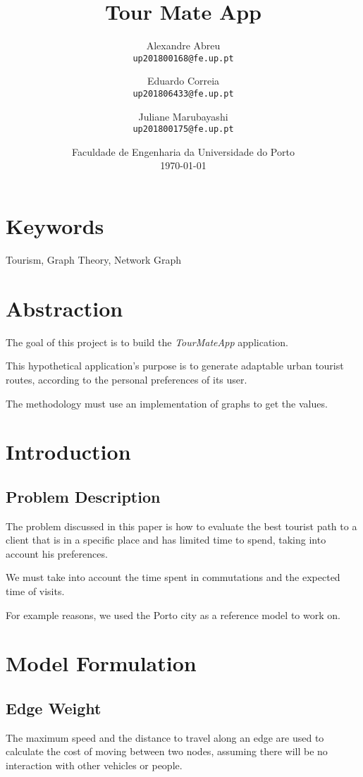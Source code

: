 \documentclass{article}
\title{\textbf{Tour Mate App}}
\author{
    Alexandre Abreu\\
    \texttt{up201800168@fe.up.pt}
    \and
    Eduardo Correia\\
    \texttt{up201806433@fe.up.pt}
    \and
    Juliane Marubayashi\\
    \texttt{up201800175@fe.up.pt}
}
\date{
    Faculdade de Engenharia da Universidade do Porto\\
    \today
}
\begin{document}
\maketitle

\section*{Keywords}

Tourism, Graph Theory, Network Graph

\section*{Abstraction} 
    The goal of this project is to build the \textit{TourMateApp} application. \par 
    This hypothetical application's purpose is to generate adaptable urban tourist routes, according to the personal preferences of its user.\par
    The methodology must use an implementation of graphs to get the values.

\section*{Introduction}
\subsection*{Problem Description}
    The problem discussed in this paper is how to evaluate the best tourist path to a client that is in a specific place and has limited time to spend, taking into account his preferences.\par
    We must take into account the time spent in commutations and the expected time of visits. \par
    For example reasons, we used the Porto city as a reference model to work on.

\section*{Model Formulation}
\subsection*{Edge Weight}
    The maximum speed and the distance to travel along an edge are used to calculate the cost of moving between two nodes, assuming there will be no interaction with other vehicles or people. \par
    
\end{document}
